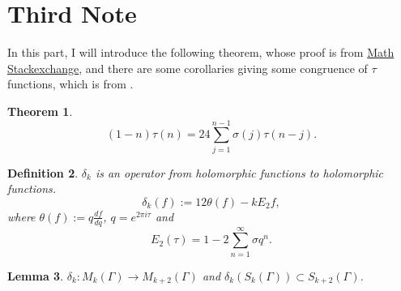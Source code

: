\documentclass{article}
\newtheorem{theorem}{Theorem}
\newtheorem{definition}[theorem]{Definition}
\newtheorem{lemma}[theorem]{Lemma}
\begin{document}
\section{Third Note}
In this part, I will introduce the following theorem, whose proof is from \href{https://math.stackexchange.com/q/84426}{Math Stackexchange}, and there are some corollaries giving some congruence of $\tau$ functions, which is from \cite{MR21951}.
\begin{theorem}\label{Ramanathan}
    \[(1-n)\tau(n)=24\sum_{j=1}^{n-1}\sigma(j)\tau(n-j).\]
\end{theorem}
\begin{definition}
    $\delta_k$ is an operator from holomorphic functions to holomorphic functions. \[\delta_k(f):=12\theta (f)-kE_2f,\] where $\theta(f):=q\frac{df}{dq}$, $q=e^{2\pi i \tau}$ and \[E_2(\tau)=1-2\sum_{n=1}^{\infty}\sigma q^n.\]
\end{definition}
\begin{lemma}
    $\delta_k: M_k(\Gamma)\to M_{k+2}(\Gamma)$ and $\delta_k(S_k(\Gamma))\subset{S_{k+2}(\Gamma)}$.
\end{lemma}
\end{document}
